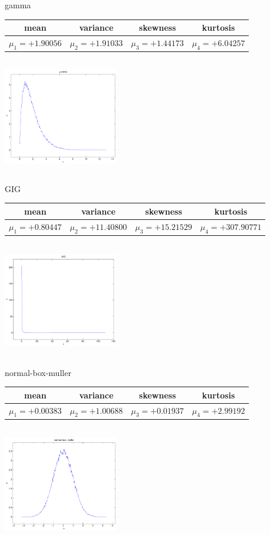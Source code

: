\documentclass[9pt]{article}
\theoremstyle{plain}
\theoremstyle{definition}
\theoremstyle{remark}
\numberwithin{equation}{section}
\begin{document}
\newpage
gamma \begin{tabular}{|c|c|c|c|}  mean & variance & skewness & kurtosis \\  \hline
$\mu_1 = +1.90056$ & $\mu_2 = +1.91033$ & $\mu_3 = +1.44173$ & $\mu_4 =+6.04257$ \\
\end{tabular}

\includegraphics[width=5cm,height=5cm]{gamma.pdf}

GIG \begin{tabular}{|c|c|c|c|}  mean & variance & skewness & kurtosis \\  \hline
$\mu_1 = +0.80447$ & $\mu_2 = +11.40800$ & $\mu_3 = +15.21529$ & $\mu_4 =+307.90771$ \\
\end{tabular}

\includegraphics[width=5cm,height=5cm]{GIG.pdf}

normal-box-muller \begin{tabular}{|c|c|c|c|}  mean & variance & skewness & kurtosis \\  \hline
$\mu_1 = +0.00383$ & $\mu_2 = +1.00688$ & $\mu_3 = +0.01937$ & $\mu_4 =+2.99192$ \\
\end{tabular}

\includegraphics[width=5cm,height=5cm]{normal-box-muller.pdf}
\end{document}

